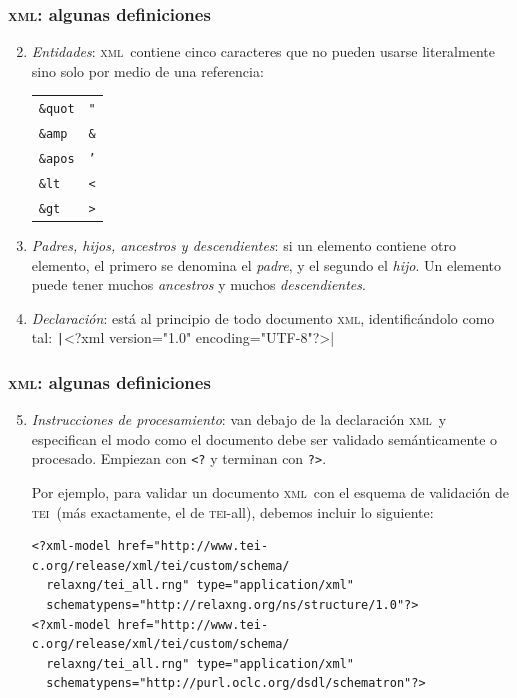 \documentclass[%
  handout, %
  ]{beamer}
\newcommand*{\rojoit}[1]{\textit{\textcolor[HTML]{8B0000}{#1}}}
\newcommand*{\TEI}{\textsc{tei}}
\newcommand*{\XML}{\textsc{xml}}
\begin{document}
\begin{frame}[fragile]
  \frametitle{\XML: algunas definiciones}
  \begin{enumerate}
    \setcounter{enumi}{1}
    \item \rojoit{Entidades}: \XML\ contiene cinco caracteres que no pueden usarse literalmente sino solo por medio de una referencia:

      \begin{center}
        \begin{tabular}{ll}
          \texttt{\&quot} & \texttt{"} \\
          \texttt{\&amp}  & \texttt{\&} \\
          \texttt{\&apos} & \texttt{'} \\
          \texttt{\&lt}   & \texttt{<} \\
          \texttt{\&gt}   & \texttt{>} \\
        \end{tabular}
      \end{center}
      
    \item \rojoit{Padres, hijos, ancestros y descendientes}: si un elemento contiene otro elemento, el primero se denomina el \textit{padre}, y el segundo el \textit{hijo}. Un elemento puede tener muchos \textit{ancestros} y muchos \textit{descendientes}.
      
    \item \rojoit{Declaración}: está al principio de todo documento \XML, identificándolo como tal: \texttt|<?xml version="1.0" encoding="UTF-8"?>|
  \end{enumerate}
\end{frame}



\begin{frame}[fragile]
  \frametitle{\XML: algunas definiciones}
  \begin{enumerate}
    \setcounter{enumi}{4}
    \item \rojoit{Instrucciones de procesamiento}: van debajo de la declaración \XML\ y especifican el modo como el documento debe ser validado semánticamente o procesado. Empiezan con \verb|<?| y terminan con \verb|?>|.

      \bigskip

      Por ejemplo, para validar un documento \XML\ con el esquema de validación de \TEI\ (más exactamente, el de \TEI-all), debemos incluir lo siguiente:

\begin{verbatim}
<?xml-model href="http://www.tei-c.org/release/xml/tei/custom/schema/
  relaxng/tei_all.rng" type="application/xml"
  schematypens="http://relaxng.org/ns/structure/1.0"?>
<?xml-model href="http://www.tei-c.org/release/xml/tei/custom/schema/
  relaxng/tei_all.rng" type="application/xml"
  schematypens="http://purl.oclc.org/dsdl/schematron"?>
\end{verbatim}
  \end{enumerate}
\end{frame}
\end{document}
